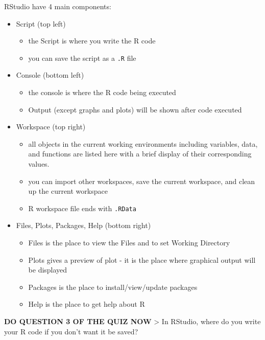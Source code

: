 \documentclass[
]{book}
\begin{document}
RStudio have 4 main components:

\begin{itemize}
\item
  Script (top left)

  \begin{itemize}
  \item
    the Script is where you write the R code
  \item
    you can save the script as a \texttt{.R} file
  \end{itemize}
\item
  Console (bottom left)

  \begin{itemize}
  \item
    the console is where the R code being executed
  \item
    Output (except graphs and plots) will be shown after code executed
  \end{itemize}
\item
  Workspace (top right)

  \begin{itemize}
  \item
    all objects in the current working environments including variables, data, and functions are listed here with a brief display of their corresponding values.
  \item
    you can import other workspaces, save the current workspace, and clean up the current workspace
  \item
    R workspace file ends with \texttt{.RData}
  \end{itemize}
\item
  Files, Plots, Packages, Help (bottom right)

  \begin{itemize}
  \item
    Files is the place to view the Files and to set Working Directory
  \item
    Plots gives a preview of plot - it is the place where graphical output will be displayed
  \item
    Packages is the place to install/view/update packages
  \item
    Help is the place to get help about R
  \end{itemize}
\end{itemize}

\textbf{DO QUESTION 3 OF THE QUIZ NOW}
\textgreater{} In RStudio, where do you write your R code if you don't want it be saved?
\end{document}
